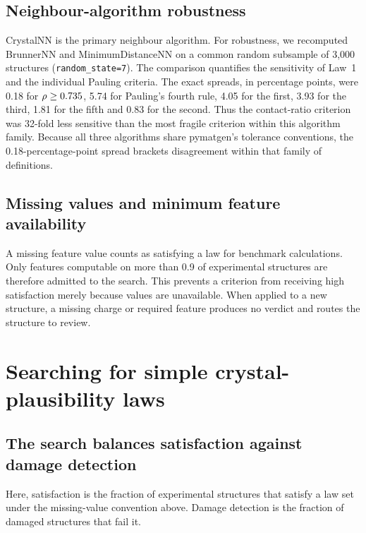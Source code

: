 \subsection{Neighbour-algorithm robustness}\label{s3.2-neighbour-algorithm-robustness}

CrystalNN is the primary neighbour algorithm. For robustness, we recomputed
BrunnerNN and MinimumDistanceNN on a common random subsample of 3{,}000
structures (\texttt{random\_state=7}). The comparison quantifies the sensitivity
of Law~1 and the individual Pauling criteria. The exact spreads, in percentage points, were
0.18 for $\rho{} \geq 0.735$, 5.74 for Pauling's fourth rule,
4.05 for the first, 3.93 for the third, 1.81 for the fifth and 0.83 for the
second. Thus the contact-ratio criterion was 32-fold less sensitive than the
most fragile criterion within this algorithm family. Because all three
algorithms share pymatgen's tolerance conventions, the 0.18-percentage-point
spread brackets disagreement within that family of definitions.

\subsection{Missing values and minimum feature availability}\label{s3.3-missing-values}

A missing feature value counts as satisfying a law for benchmark calculations. Only features computable
on more than 0.9 of experimental structures are therefore admitted to the search. This prevents a criterion
from receiving high satisfaction merely because values are unavailable. When applied to a new
structure, a missing charge or required feature produces no verdict and routes the structure
to review.

\section{Searching for simple crystal-plausibility laws}\label{note:s4}

\subsection{The search balances satisfaction against damage detection}\label{s4.1-objective}

Here, satisfaction is the fraction of experimental structures that satisfy a law set under
the missing-value convention above. Damage detection is the fraction of damaged
structures that fail it.

